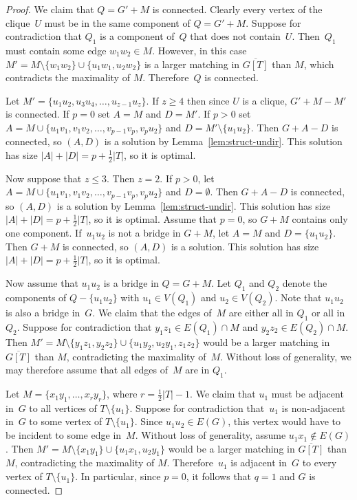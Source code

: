 \documentclass[11pt]{llncs}
\begin{document}
\begin{proof}
We claim that $Q=G'+M$ is connected. Clearly every vertex of the clique~$U$
must be in the same component of $Q=G'+M$. Suppose for contradiction that $Q_1$
is a component of~$Q$ that does not contain~$U$. Then~$Q_1$ must contain
some edge $w_1w_2 \in M$. However, in this case $M'=M \setminus\{w_1w_2\}
\cup \{u_1w_1,u_2w_2\}$ is a larger matching in $\overline{G[T]}$ than $M$,
which contradicts the maximality of $M$. Therefore~$Q$ is connected.

Let $M'=\{u_1u_2,u_3u_4,\ldots,u_{z-1}u_z\}$. If $z \geq 4$ then since $U$ is a
clique, $G'+M-M'$ is connected. If $p=0$ set $A=M$ and $D=M'$. If $p>0$
set $A=M \cup \{u_1v_1,v_1v_2,\ldots,v_{p-1}v_p,v_pu_2\}$ and $D=M'
\setminus \{u_1u_2\}$. Then $G+A-D$ is connected, so $(A,D)$ is a solution by
Lemma~\ref{lem:struct-undir}. This solution has size $|A|+|D|=p+\frac{1}{2}|T|$,
so it is optimal.

Now suppose that $z\leq 3$. Then $z=2$. If $p>0$, let $A=M \cup
\{u_1v_1,\allowbreak v_1v_2,\ldots,v_{p-1}v_p,\allowbreak v_pu_2\}$ and $D=\emptyset$. Then $G+A-D$ is connected, so
$(A,D)$ is a solution by Lemma~\ref{lem:struct-undir}. This solution has size
$|A|+|D|=p+\frac{1}{2}|T|$, so it is optimal.
Assume that $p=0$, so $G+M$ contains only one component. If~$u_1u_2$ is
not a bridge in $G+M$, let $A=M$ and $D=\{u_1u_2\}$. Then $G+M$ is connected,
so $(A,D)$ is a solution. This solution has size $|A|+|D|=p+\frac{1}{2}|T|$, so
it is optimal.

Now assume that $u_1u_2$ is a bridge in $Q=G+M$. Let $Q_1$ and $Q_2$ denote
the components of $Q-\{u_1u_2\}$ with $u_1 \in V(Q_1)$ and $u_2 \in V(Q_2)$. Note
that $u_1u_2$ is also a bridge in~$G$.  We claim that the edges of~$M$ are
either all in $Q_1$ or all in~$Q_2$. Suppose for contradiction that $y_1z_1 \in
E(Q_1) \cap M$ and $y_2z_2 \in E(Q_2) \cap M$. Then $M'=M \setminus\{y_1z_1,y_2z_2\} \cup
\{u_1y_2,u_2y_1,z_1z_2\}$ would be a larger matching in~$\overline{G[T]}$ than
$M$, contradicting the maximality of~$M$.  Without loss of generality, we may
therefore assume that all edges of~$M$ are in $Q_1$.

Let $M=\{x_1y_1,\ldots,x_ry_r\}$, where $r=\frac{1}{2}|T|-1$.  We claim that
$u_1$ must be adjacent in~$G$ to all vertices of $T \setminus \{u_1\}$. Suppose
for contradiction that~$u_1$ is non-adjacent in~$G$ to some vertex of $T
\setminus \{u_1\}$. Since $u_1u_2 \in E(G)$, this vertex would have to be
incident to some edge in~$M$. Without loss of generality, assume $u_1x_1 \notin
E(G)$. Then $M'=M\setminus\{x_1y_1\}\cup\{u_1x_1,u_2y_1\}$ would be a larger
matching in $\overline{G[T]}$ than $M$, contradicting the maximality of $M$.
Therefore~$u_1$ is adjacent in~$G$ to every vertex of $T \setminus \{u_1\}$. In
particular, since $p=0$, it follows that $q=1$ and $G$ is connected.


\end{proof}
\end{document}
